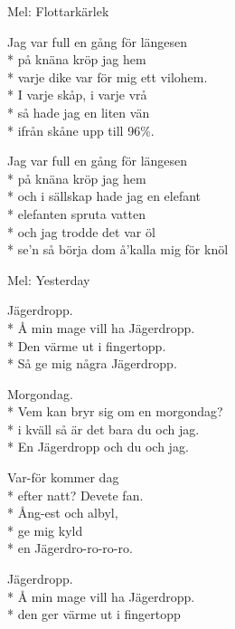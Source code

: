 \begin{SongText}[Fyllerian]
    \begin{SongInfo}
        Mel: Flottarkärlek
    \end{SongInfo}
    \begin{SongVerse}
        Jag var full en gång för längesen\\*%
        på knäna kröp jag hem\\*%
        varje dike var för mig ett vilohem.\\*%
        I varje skåp, i varje vrå\\*%
        så hade jag en liten vän\\*%
        ifrån skåne upp till 96\%.
    \end{SongVerse}
    \begin{SongVerse}
        Jag var full en gång för längesen\\*%
        på knäna kröp jag hem\\*%
        och i sällskap hade jag en elefant\\*%
        elefanten spruta vatten\\*%
        och jag trodde det var öl\\*%
        se’n så börja dom å’kalla mig för knöl
    \end{SongVerse}
\end{SongText}
\begin{SongText}
    \begin{SongInfo}
        Mel: Yesterday
    \end{SongInfo}
    \begin{SongVerse}
        Jägerdropp.\\*%
        Å min mage vill ha Jägerdropp.\\*%
        Den värme ut i fingertopp.\\*%
        Så ge mig några Jägerdropp.
    \end{SongVerse}
    \begin{SongVerse}
        Morgondag.\\*%
        Vem kan bryr sig om en morgondag?\\*%
        i kväll så är det bara du och jag.\\*%
        En Jägerdropp och du och jag.
    \end{SongVerse}
    \begin{SongVerse}
        Var-för kommer dag\\*%
        efter natt? Devete fan.\\*%
        Ång-est och albyl,\\*%
        ge mig kyld\\*%
        en Jägerdro-ro-ro-ro.
    \end{SongVerse}
    \begin{SongVerse}
        Jägerdropp.\\*%
        Å min mage vill ha Jägerdropp.\\*%
        den ger värme ut i fingertopp
    \end{SongVerse}
\end{SongText}
